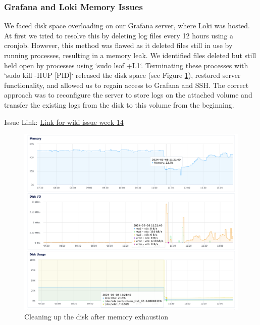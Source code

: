 \subsubsection{Grafana and Loki Memory Issues}
We faced disk space overloading on our Grafana server, where Loki was hosted. At first we tried to resolve this by deleting log files every 12 hours using a cronjob. However, this method was flawed as it deleted files still in use by running processes, resulting in a memory leak. We identified files deleted but still held open by processes using `sudo lsof +L1`. Terminating these processes with `sudo kill -HUP [PID]` released the disk space (see Figure \ref{fig:grafana-memoryleak}), restored server functionality, and allowed us to regain access to Grafana and SSH. The correct approach was to reconfigure the server to store logs on the attached volume and transfer the existing logs from the disk to this volume from the beginning.

Issue Link: \href{https://github.com/DevopsGroupC/Minitwit/wiki/Week-14}{\color{blue}Link for wiki issue week 14}

\begin{figure}[H]
\centering
\includegraphics[height=0.9\textwidth]{images/CleanUpMemoryLeakGrafanaServer.png}
\caption{Cleaning up the disk after memory exhaustion}
\label{fig:grafana-memoryleak}
\end{figure}

